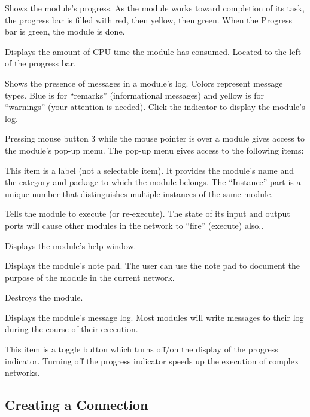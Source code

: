 \begin{description}
   Shows the module's progress.  As the module
  works toward completion of its task, the progress bar is filled
  with red, then yellow, then green.  When the Progress bar
  is green, the module is done.
  
   Displays the amount of CPU time the module has
  consumed.  Located to the left of the progress bar.
  
   Shows the presence of messages in a
  module's log.  Colors represent message types.  Blue is for
  ``remarks'' (informational messages) and yellow is for ``warnings''
  (your attention is needed).  Click the indicator to display the
  module's log.

 Pressing mouse button 3 while the mouse
  pointer is over a module gives access to the module's pop-up menu.  The
  pop-up menu gives access to the following items:
  \begin{description}
     This item is a
    label (not a selectable item).  It provides the module's name and
    the category and package to which the module belongs.  The
    ``Instance'' part is a unique number that distinguishes multiple
    instances of the same module.

     Tells the module to
    execute (or re-execute).  The state of its input and
    output ports will cause other modules in the network to
    ``fire'' (execute) also..

     Displays the module's help window.
    
     Displays the module's note pad.
    The user can use the note pad to document the purpose of the module in
    the current network.

     Destroys the module.
    
     Displays the module's message log.  Most
    modules will write messages to their log during the course of
    their execution.
    
     This item is a toggle button which
    turns off/on the display of the progress indicator.  Turning off
    the progress indicator speeds up the execution of complex
    networks.
  \end{description}
\end{description}


\subsection{Creating a Connection}
\label{sec:connectmods}


